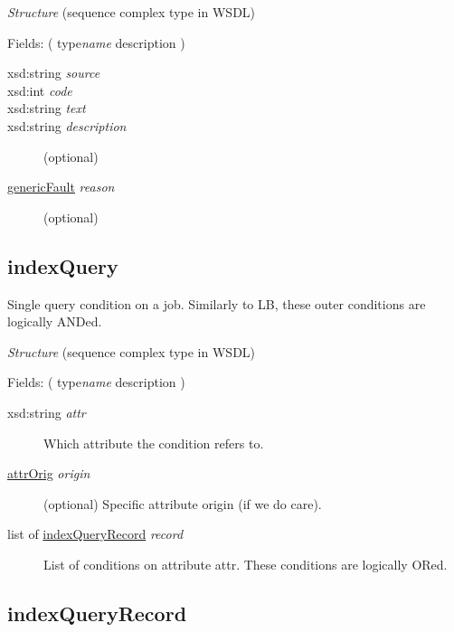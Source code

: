 {\em{Structure}} (sequence complex type in WSDL)

Fields: ( type{\ttfamily\itshape{{name}}} description )

\begin{description}
\item[{xsd:string {\ttfamily\itshape{{source}}}}]\null{}

\item[{xsd:int {\ttfamily\itshape{{code}}}}]\null{}

\item[{xsd:string {\ttfamily\itshape{{text}}}}]\null{}

\item[{xsd:string {\ttfamily\itshape{{description}}}}]\null{}
(optional)
\item[{\hyperlink{type:genericFault}{genericFault} {\ttfamily\itshape{{reason}}}}]\null{}
(optional)
\end{description}
\noindent \subsection{indexQuery}
\label{type:indexQuery}\hypertarget{type:indexQuery}{}%

Single query condition on a job. Similarly to LB, these outer conditions are logically ANDed.

{\em{Structure}} (sequence complex type in WSDL)

Fields: ( type{\ttfamily\itshape{{name}}} description )

\begin{description}
\item[{xsd:string {\ttfamily\itshape{{attr}}}}]\null{}
Which attribute the condition refers to.
\item[{\hyperlink{type:attrOrig}{attrOrig} {\ttfamily\itshape{{origin}}}}]\null{}
(optional) Specific attribute origin (if we do care).
\item[{list of \hyperlink{type:indexQueryRecord}{indexQueryRecord} {\ttfamily\itshape{{record}}}}]\null{}
List of conditions on attribute attr. These conditions are logically ORed.
\end{description}
\noindent \subsection{indexQueryRecord}
\label{type:indexQueryRecord}\hypertarget{type:indexQueryRecord}{}%

